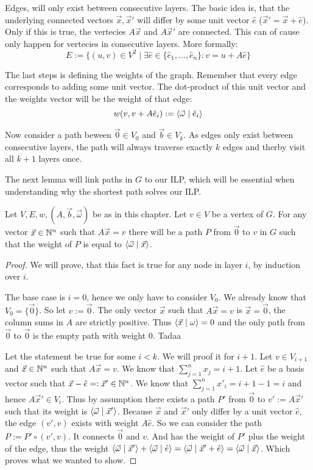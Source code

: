 Edges, will only exist between consecutive layers. The basic idea is, that the underlying connected vectors $\vec x, \vec x'$ will differ by some unit vector $\hat e$ ($\vec x' = \vec x + \hat e$). Only if this is true, the vertecies $A\vec x$ and $A\vec x'$ are connected. This can of cause only happen for vertecies in consecutive layers. More formally: 
$$E := \{(u, v) \in V^2\mid \exists \hat e \in \{\hat e_1, \dots, \hat e_n\}\colon v = u + A\hat e\}$$

The last steps is defining the weights of the graph. Remember that every edge corresponds to adding some unit vector. The dot-product of this unit vector and the weights vector will be the weight of that edge:
$$w(v, v + A\hat e_i) := \langle \vec \omega \mid \hat e_i \rangle$$

Now consider a path beween $\vec 0\in V_0$ and $\vec b \in V_k$. As edges only exist between consecutive layers, the path will always traverse exactly $k$ edges and therby visit all $k+1$ layers once.

The next lemma will link paths in $G$ to our ILP, which will be essential when understanding why the shortest path solves our ILP.

\begin{lemma}
    Let $V, E, w, (A, \vec b, \vec \omega)$ be as in this chapter. Let $v \in V$ be a vertex of $G$. For any vector $\vec x \in \mathbb{N}^n$ such that $A\vec x = v$ there will be a path $P$ from $\vec 0$ to $v$ in $G$ such that the weight of $P$ is equal to $\langle \vec\omega \mid \vec x \rangle$. 
\end{lemma}
\begin{proof}
    We will prove, that this fact is true for any node in layer $i$, by induction over $i$. 
    
    The base case is $i=0$, hence we only have to consider $V_0$. We already know that $V_0 = \{\vec0\}$. So let $v := \vec 0$. The only vector $\vec x$ such that $A\vec x = v$ is $\vec x = \vec 0$, the column sums in $A$ are strictly positive. Thus $\langle \vec x \mid \omega \rangle = 0$ and the only path from $\vec 0$ to $\vec 0$ is the empty path with weight 0. Tadaa
    
    Let the statement be true for some $i < k$. We will proof it for $i+1$. Let $v \in V_{i+1}$ and $\vec x \in \mathbb{N}^n$ such that $A\vec x = v$. We know that $\sum_{j=1}^n x_j = i+1$. Let $\hat e$ be a basis vector such that $\vec x - \hat e =: \vec x' \in \mathbb{N}^n$. We know that $\sum_{j=1}^{n} x'_i = i+1-1=i$ and hence $A\vec x' \in V_i$. Thus by assumption there exists a path $P'$ from $\vec 0$ to $v' := A\vec x'$ such that its weight is $\langle \vec \omega \mid \vec x' \rangle$. Because $\vec x$ and $\vec x'$ only differ by a unit vector $\hat e$, the edge $(v', v)$ exists with weight $A\hat e$. So we can consider the path $P := P' \circ (v', v)$. It connects $\vec 0$ and $v$. And has the weight of $P'$ plus the weight of the edge, thus the weight $\langle \vec \omega \mid \vec x' \rangle + \langle \vec\omega \mid \hat e \rangle = \langle \vec \omega \mid \vec x' + \hat e \rangle = \langle \vec \omega \mid \vec x \rangle$. Which proves what we wanted to show.
\end{proof}

